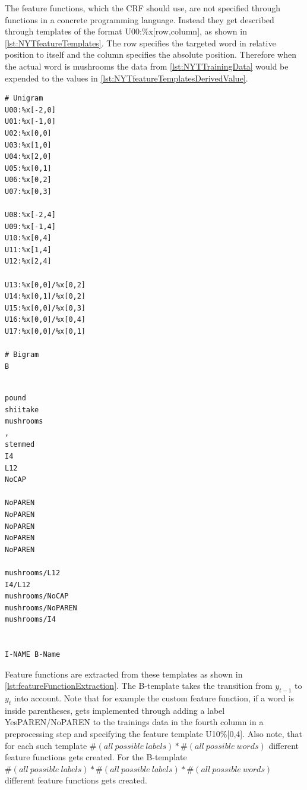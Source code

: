 \documentclass[12pt, twoside]{report}
\begin{document}
The feature functions, which the CRF should use, are not specified through functions in a concrete programming language. Instead they get described through templates of the format U00:\%x[row,column], as shown in \cref{lst:NYTfeatureTemplates}. The row specifies the targeted word in relative position to itself and the column specifies the absolute position. Therefore when the actual word is mushrooms the data from \cref{lst:NYTTrainingData} would be expended to the values in \cref{lst:NYTfeatureTemplatesDerivedValue}.

\newpage
\begin{minipage}{0.4\textwidth} 
\begin{lstlisting}[frame=single, caption={Feature templates for New York Times CRF}, label=lst:NYTfeatureTemplates]
# Unigram               
U00:%x[-2,0]             
U01:%x[-1,0]              
U02:%x[0,0]
U03:%x[1,0]
U04:%x[2,0]
U05:%x[0,1]
U06:%x[0,2]
U07:%x[0,3]

U08:%x[-2,4]
U09:%x[-1,4]
U10:%x[0,4]
U11:%x[1,4]
U12:%x[2,4]

U13:%x[0,0]/%x[0,2]
U14:%x[0,1]/%x[0,2]
U15:%x[0,0]/%x[0,3]
U16:%x[0,0]/%x[0,4]
U17:%x[0,0]/%x[0,1]

# Bigram
B
\end{lstlisting}
\end{minipage}
\hfill
\begin{minipage}{0.5\textwidth} 
\begin{lstlisting}[frame=single, caption={Derived value when the current word in \cref{lst:NYTTrainingData} is mushrooms}, label=lst:NYTfeatureTemplatesDerivedValue]
            
pound            
shiitake            
mushrooms
,
stemmed
I4
L12
NoCAP

NoPAREN
NoPAREN
NoPAREN
NoPAREN
NoPAREN

mushrooms/L12
I4/L12
mushrooms/NoCAP
mushrooms/NoPAREN
mushrooms/I4


I-NAME B-Name
\end{lstlisting}
\end{minipage}

Feature functions are extracted from these templates as shown in \cref{lst:featureFunctionExtraction}. The B-template takes the transition from $y_{t-1}$ to $y_t$ into account. Note that for example the custom feature function, if a word is inside parentheses, gets implemented through adding a label YesPAREN/NoPAREN to the trainings data in the fourth column in a preprocessing step and specifying the feature template U10\%[0,4]. Also note, that for each such template $\#(all\ possible\ labels)*\#(all\ possible\ words)$ different feature functions gets created. For the B-template $\#(all\ possible\ labels)*\#(all\ possible\ labels)*\#(all\ possible\ words)$ different feature functions gets created.
\end{document}
